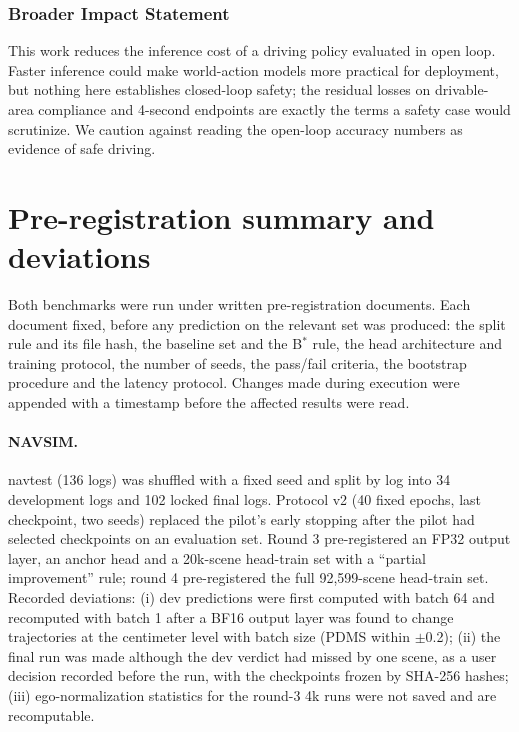 \documentclass[10pt]{article}
\newcommand{\Bstar}{B$^{*}$}
\begin{document}
\subsubsection*{Broader Impact Statement}
This work reduces the inference cost of a driving policy evaluated in open loop. Faster inference could make world-action models more practical for deployment, but nothing here establishes closed-loop safety; the residual losses on drivable-area compliance and 4-second endpoints are exactly the terms a safety case would scrutinize. We caution against reading the open-loop accuracy numbers as evidence of safe driving.




\appendix

\section{Pre-registration summary and deviations}
\label{app:prereg}

Both benchmarks were run under written pre-registration documents. Each document fixed, before any prediction on the relevant set was produced: the split rule and its file hash, the baseline set and the \Bstar{} rule, the head architecture and training protocol, the number of seeds, the pass/fail criteria, the bootstrap procedure and the latency protocol. Changes made during execution were appended with a timestamp before the affected results were read.

\paragraph{NAVSIM.} navtest (136 logs) was shuffled with a fixed seed and split by log into 34 development logs and 102 locked final logs. Protocol v2 (40 fixed epochs, last checkpoint, two seeds) replaced the pilot's early stopping after the pilot had selected checkpoints on an evaluation set. Round 3 pre-registered an FP32 output layer, an anchor head and a 20k-scene head-train set with a ``partial improvement'' rule; round 4 pre-registered the full 92,599-scene head-train set. Recorded deviations: (i) dev predictions were first computed with batch 64 and recomputed with batch 1 after a BF16 output layer was found to change trajectories at the centimeter level with batch size (PDMS within $\pm$0.2); (ii) the final run was made although the dev verdict had missed by one scene, as a user decision recorded before the run, with the checkpoints frozen by SHA-256 hashes; (iii) ego-normalization statistics for the round-3 4k runs were not saved and are recomputable.
\end{document}
